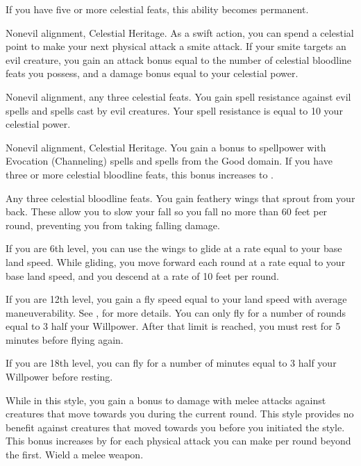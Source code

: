 If you have five or more celestial feats, this ability becomes permanent.

\featpres Nonevil alignment, Celestial Heritage.
\featben As a swift action, you can spend a celestial point to make your next physical attack a smite attack.
If your smite targets an evil creature, you gain an attack bonus equal to the number of celestial bloodline feats you possess, and a damage bonus equal to your celestial power.

\featpres Nonevil alignment, any three celestial feats.
\featben You gain spell resistance against evil spells and spells cast by evil creatures.
Your spell resistance is equal to 10 \add your celestial power.

\featpres Nonevil alignment, Celestial Heritage.
\featben You gain a  bonus to spellpower with Evocation (Channeling) spells and spells from the Good domain.
If you have three or more celestial bloodline feats, this bonus increases to .

\featpre Any three celestial bloodline feats.
\featben You gain feathery wings that sprout from your back.
These allow you to slow your fall so you fall no more than 60 feet per round, preventing you from taking falling damage.

If you are 6th level, you can use the wings to glide at a rate equal to your base land speed.
While gliding, you move forward each round at a rate equal to your base land speed, and you descend at a rate of 10 feet per round.

If you are 12th level, you gain a fly speed equal to your land speed with average maneuverability.
See , for more details.
You can only fly for a number of rounds equal to 3 \add half your Willpower.
After that limit is reached, you must rest for 5 minutes before flying again.

If you are 18th level, you can fly for a number of minutes equal to 3 \add half your Willpower before resting.

\featben While in this style, you gain a  bonus to damage with melee attacks against creatures that move towards you during the current round.
This style provides no benefit against creatures that moved towards you before you initiated the style.
This bonus increases by  for each physical attack you can make per round beyond the first.
\stylereq Wield a melee weapon.


